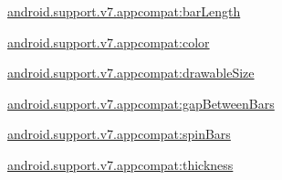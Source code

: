 {\ttfamily \hyperlink{classandroid_1_1support_1_1v7_1_1appcompat_1_1R_1_1styleable_ae8ef18fa510292b2f8b05f36c70631bb}{android.\+support.\+v7.\+appcompat\+:bar\+Length}}

{\ttfamily \hyperlink{classandroid_1_1support_1_1v7_1_1appcompat_1_1R_1_1styleable_a9cc1908fc44ebedfcf125c65a0ff5e0b}{android.\+support.\+v7.\+appcompat\+:color}}

{\ttfamily \hyperlink{classandroid_1_1support_1_1v7_1_1appcompat_1_1R_1_1styleable_a579e9b0e2747d0ee8099120f0755be5e}{android.\+support.\+v7.\+appcompat\+:drawable\+Size}}

{\ttfamily \hyperlink{classandroid_1_1support_1_1v7_1_1appcompat_1_1R_1_1styleable_a737c92b3ede20bdc07b042896c38c3c2}{android.\+support.\+v7.\+appcompat\+:gap\+Between\+Bars}}

{\ttfamily \hyperlink{classandroid_1_1support_1_1v7_1_1appcompat_1_1R_1_1styleable_a22785cf0da7609e82faa84d7f2aa2f93}{android.\+support.\+v7.\+appcompat\+:spin\+Bars}}

{\ttfamily \hyperlink{classandroid_1_1support_1_1v7_1_1appcompat_1_1R_1_1styleable_af9c043f5d15f590d94caaa0afa21c0dd}{android.\+support.\+v7.\+appcompat\+:thickness}}

